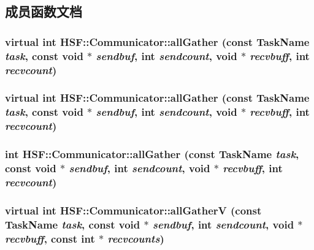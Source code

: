 \subsection{成员函数文档}
\hypertarget{classHSF_1_1Communicator_a1d5b58afa61131c24cf2c193a1959d35}{
\subsubsection[{allGather}]{\setlength{\rightskip}{0pt plus 5cm}virtual int HSF::Communicator::allGather (const {\bf TaskName} {\em task}, \/  const void $\ast$ {\em sendbuf}, \/  int {\em sendcount}, \/  void $\ast$ {\em recvbuff}, \/  int {\em recvcount})}}
\label{classHSF_1_1Communicator_a1d5b58afa61131c24cf2c193a1959d35}
\hypertarget{classHSF_1_1Communicator_a1d5b58afa61131c24cf2c193a1959d35}{
\subsubsection[{allGather}]{\setlength{\rightskip}{0pt plus 5cm}virtual int HSF::Communicator::allGather (const {\bf TaskName} {\em task}, \/  const void $\ast$ {\em sendbuf}, \/  int {\em sendcount}, \/  void $\ast$ {\em recvbuff}, \/  int {\em recvcount})}}
\label{classHSF_1_1Communicator_a1d5b58afa61131c24cf2c193a1959d35}
\hypertarget{classHSF_1_1Communicator_a5ed8822c246260f867db03b07e914a45}{
\subsubsection[{allGather}]{\setlength{\rightskip}{0pt plus 5cm}int HSF::Communicator::allGather (const {\bf TaskName} {\em task}, \/  const void $\ast$ {\em sendbuf}, \/  int {\em sendcount}, \/  void $\ast$ {\em recvbuff}, \/  int {\em recvcount})}}
\label{classHSF_1_1Communicator_a5ed8822c246260f867db03b07e914a45}
\hypertarget{classHSF_1_1Communicator_a4c1230db745ac434c7ccf883ec385ac0}{
\subsubsection[{allGatherV}]{\setlength{\rightskip}{0pt plus 5cm}virtual int HSF::Communicator::allGatherV (const {\bf TaskName} {\em task}, \/  const void $\ast$ {\em sendbuf}, \/  int {\em sendcount}, \/  void $\ast$ {\em recvbuff}, \/  const int $\ast$ {\em recvcounts})}}
